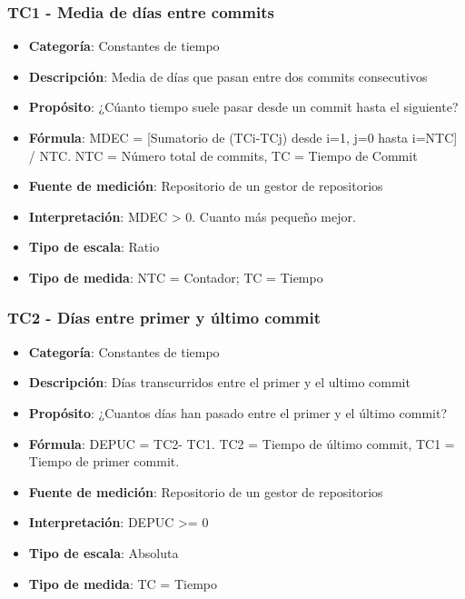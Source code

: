 \subsubsection{TC1 - Media de días entre commits}
\begin{itemize}
	\item \textbf{Categoría}: Constantes de tiempo
	\item \textbf{Descripción}: Media de días que pasan entre dos commits consecutivos
	\item \textbf{Propósito}: ¿Cúanto tiempo suele pasar desde un commit hasta el siguiente?
	\item \textbf{Fórmula}: MDEC = [Sumatorio de (TCi-TCj) desde i=1, j=0 hasta i=NTC] / NTC. NTC = Número total de commits, TC = Tiempo de Commit 
	\item \textbf{Fuente de medición}: Repositorio de un gestor de repositorios
	\item \textbf{Interpretación}: MDEC > 0. Cuanto más pequeño mejor.
	\item \textbf{Tipo de escala}: Ratio
	\item \textbf{Tipo de medida}: NTC = Contador; TC = Tiempo
\end{itemize}
\subsubsection{TC2 - Días entre primer y último commit}
\begin{itemize}
	\item \textbf{Categoría}: Constantes de tiempo
	\item \textbf{Descripción}: Días transcurridos entre el primer y el ultimo commit 
	\item \textbf{Propósito}: ¿Cuantos días han pasado entre el primer y el último commit?
	\item \textbf{Fórmula}: DEPUC = TC2- TC1. TC2 = Tiempo de último commit, TC1 = Tiempo de primer commit.
	\item \textbf{Fuente de medición}: Repositorio de un gestor de repositorios
	\item \textbf{Interpretación}: DEPUC >= 0
	\item \textbf{Tipo de escala}: Absoluta
	\item \textbf{Tipo de medida}: TC = Tiempo
\end{itemize}
